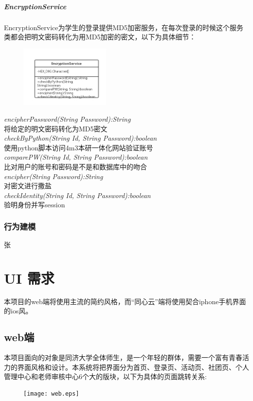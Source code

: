 \documentclass[UTF8]{ctexart}
\begin{document}
\subparagraph{EncryptionService}
EncryptionService为学生的登录提供MD5加密服务，在每次登录的时候这个服务类都会把明文密码转化为用MD5加密的密文，以下为具体细节：
\newline
\begin{figure}[H]
\centering
\includegraphics[width = 0.4\textwidth]{Encryption-rs.png}
\end{figure}
\begin{center}
\emph{encipherPassword(String Password):String}\\
将给定的明文密码转化为MD5密文\\
\emph{checkByPython(String Id, String Password):boolean}\\
使用python脚本访问4m3本研一体化网站验证账号\\
\emph{comparePW(String Id, String Password):boolean}\\
比对用户的账号和密码是不是和数据库中的吻合\\
\emph{encipher(String Password):String}\\
对密文进行撒盐\\
\emph{checkIdentity(String Id, String Password):boolean}\\
验明身份并写session
\end{center}

\subsubsection{行为建模}
张

\section{UI 需求}
本项目的web端将使用主流的简约风格，而“同心云”端将使用契合iphone手机界面的ios风。
\subsection{web端}
本项目面向的对象是同济大学全体师生，是一个年轻的群体，需要一个富有青春活力的界面风格和设计。本系统将把界面分为首页、登录页、活动页、社团页、个人管理中心和老师审核中心6个大的版块，以下为具体的页面跳转关系:
\newline
\begin{figure}[H]
\centering
\texttt{[image: web.eps]}
\end{figure}
\end{document}
